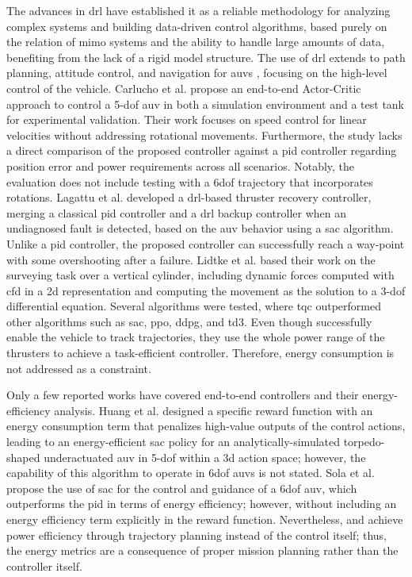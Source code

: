 The advances in \ac{drl} have established it as a reliable methodology for analyzing complex systems and building data-driven control algorithms, based purely on the relation of \ac{mimo} systems and the ability to handle large amounts of data, benefiting from the lack of a rigid model structure. The use of \ac{drl} extends to path planning, attitude control, and navigation for \acp{auv} \cite{Singh2023}, focusing on the high-level control of the vehicle. Carlucho et al. \cite{carlucho2018} propose an end-to-end Actor-Critic approach to control a 5-\acs{dof} \ac{auv} in both a simulation environment and a test tank for experimental validation. Their work focuses on speed control for linear velocities without addressing rotational movements. Furthermore, the study lacks a direct comparison of the proposed controller against a \ac{pid} controller regarding position error and power requirements across all scenarios. Notably, the evaluation does not include testing with a \ac{6dof} trajectory that incorporates rotations. Lagattu et al. \cite{lagattu2024} developed a \ac{drl}-based thruster recovery controller, merging a classical \ac{pid} controller and a \ac{drl} backup controller when an undiagnosed fault is detected, based on the \ac{auv} behavior using a \ac{sac} algorithm. Unlike a \ac{pid} controller, the proposed controller can successfully reach a way-point with some overshooting after a failure. Lidtke et al. \cite{lidtke2024} based their work on the surveying task over a vertical cylinder, including dynamic forces computed with \ac{cfd} in a \ac{2d} representation and computing the movement as the solution to a 3-\acs{dof} differential equation. Several algorithms were tested, where \ac{tqc} outperformed other algorithms such as \ac{sac}, \ac{ppo}, \ac{ddpg}, and \ac{td3}. Even though \cite{carlucho2018, lagattu2024, lidtke2024} successfully enable the vehicle to track trajectories, they use the whole power range of the thrusters to achieve a task-efficient controller. Therefore, energy consumption is not addressed as a constraint.

Only a few reported works have covered end-to-end controllers and their energy-efficiency analysis. Huang et al. \cite{Huang2022A} designed a specific reward function with an energy consumption term that penalizes high-value outputs of the control actions, leading to an energy-efficient \ac{sac} policy for an analytically-simulated torpedo-shaped underactuated \ac{auv} in 5-\acs{dof} within a \ac{3d} action space; however, the capability of this algorithm to operate in \ac{6dof} \acp{auv} is not stated. Sola et al. \cite{Sola2022} propose the use of \ac{sac} for the control and guidance of a \ac{6dof} \ac{auv}, which outperforms the \ac{pid} in terms of energy efficiency; however, without including an energy efficiency term explicitly in the reward function. Nevertheless, \cite{Huang2022A} and \cite{Sola2022} achieve power efficiency through trajectory planning instead of the control itself; thus, the energy metrics are a consequence of proper mission planning rather than the controller itself.

